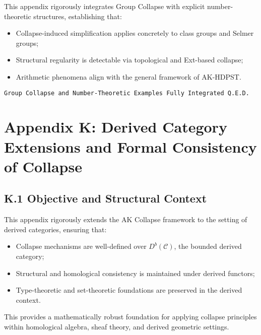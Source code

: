 \documentclass[11pt]{article}
\begin{document}
This appendix rigorously integrates Group Collapse with explicit number-theoretic structures, establishing that:

\begin{itemize}
    \item Collapse-induced simplification applies concretely to class groups and Selmer groups;
    \item Structural regularity is detectable via topological and Ext-based collapse;
    \item Arithmetic phenomena align with the general framework of AK-HDPST.
\end{itemize}

\begin{flushright}
\texttt{Group Collapse and Number-Theoretic Examples \quad Fully Integrated \quad Q.E.D.}
\end{flushright}



\section*{Appendix K: Derived Category Extensions and Formal Consistency of Collapse}

\subsection*{K.1 Objective and Structural Context}

This appendix rigorously extends the AK Collapse framework to the setting of derived categories, ensuring that:

\begin{itemize}
    \item Collapse mechanisms are well-defined over \( D^b(\mathcal{C}) \), the bounded derived category;
    \item Structural and homological consistency is maintained under derived functors;
    \item Type-theoretic and set-theoretic foundations are preserved in the derived context.
\end{itemize}

This provides a mathematically robust foundation for applying collapse principles within homological algebra, sheaf theory, and derived geometric settings.
\end{document}
